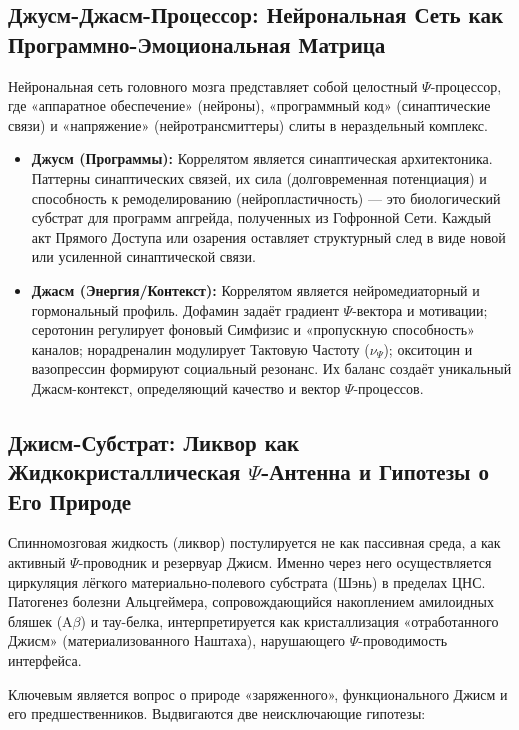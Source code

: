 \documentclass[a4paper,12pt]{article}
\begin{document}
\subsection{Джусм-Джасм-Процессор: Нейрональная Сеть как Программно-Эмоциональная Матрица}

Нейрональная сеть головного мозга представляет собой целостный $\Psi$-процессор, где «аппаратное обеспечение» (нейроны), «программный код» (синаптические связи) и «напряжение» (нейротрансмиттеры) слиты в нераздельный комплекс.

\begin{itemize}
	\item \textbf{Джусм (Программы):} Коррелятом является синаптическая архитектоника. Паттерны синаптических связей, их сила (долговременная потенциация) и способность к ремоделированию (нейропластичность) — это биологический субстрат для программ апгрейда, полученных из Гофронной Сети. Каждый акт Прямого Доступа или озарения оставляет структурный след в виде новой или усиленной синаптической связи.
	
	\item \textbf{Джасм (Энергия/Контекст):} Коррелятом является нейромедиаторный и гормональный профиль. Дофамин задаёт градиент $\Psi$-вектора и мотивации; серотонин регулирует фоновый Симфизис и «пропускную способность» каналов; норадреналин модулирует Тактовую Частоту ($\nu_{\Psi}$); окситоцин и вазопрессин формируют социальный резонанс. Их баланс создаёт уникальный Джасм-контекст, определяющий качество и вектор $\Psi$-процессов.
\end{itemize}

\subsection{Джисм-Субстрат: Ликвор как Жидкокристаллическая $\Psi$-Антенна и Гипотезы о Его Природе}

Спинномозговая жидкость (ликвор) постулируется не как пассивная среда, а как активный $\Psi$-проводник и резервуар Джисм. Именно через него осуществляется циркуляция лёгкого материально-полевого субстрата (Шэнь) в пределах ЦНС. Патогенез болезни Альцгеймера, сопровождающийся накоплением амилоидных бляшек (A$\beta$) и тау-белка, интерпретируется как кристаллизация «отработанного Джисм» (материализованного Наштаха), нарушающего $\Psi$-проводимость интерфейса.

Ключевым является вопрос о природе «заряженного», функционального Джисм и его предшественников. Выдвигаются две неисключающие гипотезы:
\end{document}
